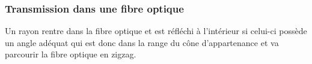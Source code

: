 			\subsubsection{Transmission dans une fibre optique}
				Un rayon rentre dans la fibre optique et est réfléchi à l'intérieur si celui-ci possède un angle adéquat qui est donc dans la range du cône d'appartenance et va parcourir la fibre optique en zigzag.
				